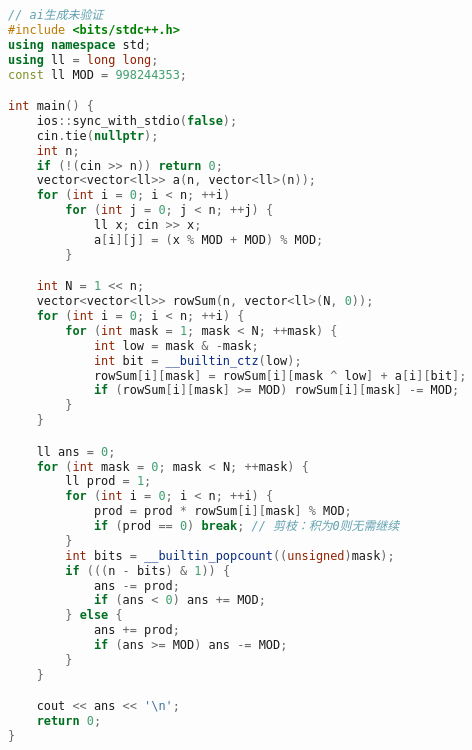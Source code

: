 \begin{lstlisting}[language=C++,caption={优化的 Ryser 实现：先预处理每行的子集和，时间复杂度$O(n 2^n)$}]
// ai生成未验证
#include <bits/stdc++.h>
using namespace std;
using ll = long long;
const ll MOD = 998244353;

int main() {
    ios::sync_with_stdio(false);
    cin.tie(nullptr);
    int n;
    if (!(cin >> n)) return 0;
    vector<vector<ll>> a(n, vector<ll>(n));
    for (int i = 0; i < n; ++i)
        for (int j = 0; j < n; ++j) {
            ll x; cin >> x;
            a[i][j] = (x % MOD + MOD) % MOD;
        }

    int N = 1 << n;
    vector<vector<ll>> rowSum(n, vector<ll>(N, 0));
    for (int i = 0; i < n; ++i) {
        for (int mask = 1; mask < N; ++mask) {
            int low = mask & -mask;
            int bit = __builtin_ctz(low);
            rowSum[i][mask] = rowSum[i][mask ^ low] + a[i][bit];
            if (rowSum[i][mask] >= MOD) rowSum[i][mask] -= MOD;
        }
    }

    ll ans = 0;
    for (int mask = 0; mask < N; ++mask) {
        ll prod = 1;
        for (int i = 0; i < n; ++i) {
            prod = prod * rowSum[i][mask] % MOD;
            if (prod == 0) break; // 剪枝：积为0则无需继续
        }
        int bits = __builtin_popcount((unsigned)mask);
        if (((n - bits) & 1)) {
            ans -= prod;
            if (ans < 0) ans += MOD;
        } else {
            ans += prod;
            if (ans >= MOD) ans -= MOD;
        }
    }

    cout << ans << '\n';
    return 0;
}

\end{lstlisting}



